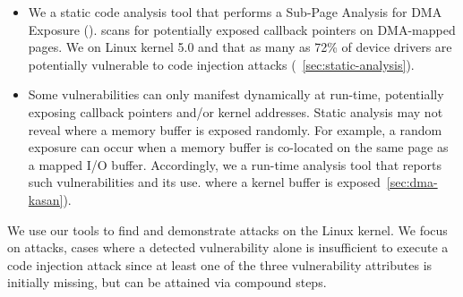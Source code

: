 \begin{itemize}
    \item We \DIFdelbegin {}\DIFdelend \DIFaddbegin {}\DIFaddend a static code analysis tool that performs a Sub-Page Analysis for DMA Exposure (\tool). \tool scans for potentially exposed callback pointers on DMA-mapped pages. We \DIFdelbegin {}\DIFdelend \DIFaddbegin {}\DIFaddend \tool on Linux kernel 5.0 and \DIFdelbegin {}\DIFdelend \DIFaddbegin {}\DIFaddend that as many as 72\% of device drivers are potentially vulnerable to code injection attacks (\DIFdelbegin {}\DIFdelend \DIFaddbegin {}\DIFaddend ~\ref{sec:static-analysis}). 

    \item Some \subpage{} vulnerabilities can only manifest dynamically at run-time, potentially exposing callback pointers and/or kernel addresses. Static analysis may not reveal  \DIFdelbegin {}\DIFdelend \DIFaddbegin {}\DIFaddend where a memory buffer is exposed randomly. For example, \DIFdelbegin {}\DIFdelend a random exposure can occur when a memory buffer is co-located on the same page as a mapped I/O buffer. Accordingly, we \DIFdelbegin {}\DIFdelend \DIFaddbegin {}\DIFaddend a run-time analysis tool \DIFdelbegin {}%
\DIFdel{) }\DIFdelend that reports such vulnerabilities and \DIFdelbegin {}\DIFdelend \DIFaddbegin {}\DIFaddend its use. \DIFaddbegin {}\DIFaddend \dkasan\DIFdelbegin {}\DIFdelend \DIFaddbegin {}\DIFaddend where a kernel buffer is exposed\DIFaddbegin {}\DIFaddend ~\DIFdelbegin {}\DIFdelend \ref{sec:dma-kasan}).
\end{itemize}

We use our tools to find and demonstrate attacks on the Linux kernel. We focus on \compound attacks, cases where a detected \subpage vulnerability alone is insufficient to execute a code injection attack since at least one of the three vulnerability attributes is initially missing, but can be attained via compound steps.

